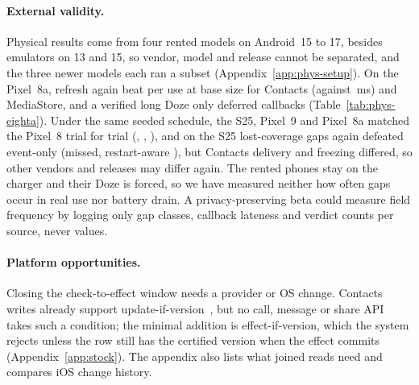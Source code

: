 \paragraph{External validity.} Physical results come from four rented models on Android~15 to 17, besides emulators on 13 and 15, so vendor, model and release cannot be separated, and the three newer models each ran a subset (Appendix~\ref{app:phys-setup}). On the Pixel~8a, refresh again beat \stamp per use at base size for Contacts (\PhysEightACostContactsRefresh against \PhysEightACostContactsStamp\,ms) and MediaStore, and a verified long Doze only deferred callbacks (Table~\ref{tab:phys-eighta}). Under the same seeded schedule, the S25, Pixel~9 and Pixel~8a matched the Pixel~8 trial for trial (\PhysSamsungRaceSameAsPixel, \PhysNineRaceSameAsPixel, \PhysEightARaceSameAsPixel), and on the S25 lost-coverage gaps again defeated event-only (\PhysSamsungGapLostEv missed, restart-aware \PhysSamsungGapLostEvr), but Contacts delivery and freezing differed, so other vendors and releases may differ again. The rented phones stay on the charger and their Doze is forced, so we have measured neither how often gaps occur in real use nor battery drain. A privacy-preserving beta could measure field frequency by logging only gap classes, callback lateness and verdict counts per source, never values.

\paragraph{Platform opportunities.} Closing the check-to-effect window needs a provider or OS change. Contacts writes already support update-if-version~\cite{android_rawcontacts,android_cpo}, but no call, message or share API takes such a condition; the minimal addition is effect-if-version, which the system rejects unless the row still has the certified version when the effect commits (Appendix~\ref{app:stock}). The appendix also lists what joined reads need and compares iOS change history.
